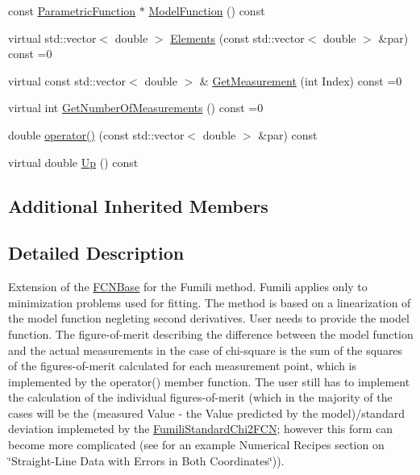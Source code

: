 \begin{DoxyCompactItemize}
\item 
const \mbox{\hyperlink{classROOT_1_1Minuit2_1_1ParametricFunction}{Parametric\+Function}} $\ast$ \mbox{\hyperlink{classROOT_1_1Minuit2_1_1FumiliChi2FCN_a3d31739e476a413e0c5616bb0c6283b9}{Model\+Function}} () const
\item 
virtual std\+::vector$<$ double $>$ \mbox{\hyperlink{classROOT_1_1Minuit2_1_1FumiliChi2FCN_a25cc8dcc2eff831b3c0a94bf5413c2cd}{Elements}} (const std\+::vector$<$ double $>$ \&par) const =0
\item 
virtual const std\+::vector$<$ double $>$ \& \mbox{\hyperlink{classROOT_1_1Minuit2_1_1FumiliChi2FCN_a1831875c53596cd4aa52ea536de53b60}{Get\+Measurement}} (int Index) const =0
\item 
virtual int \mbox{\hyperlink{classROOT_1_1Minuit2_1_1FumiliChi2FCN_afa1acb8484d1c1825de0dd641e301717}{Get\+Number\+Of\+Measurements}} () const =0
\item 
double \mbox{\hyperlink{classROOT_1_1Minuit2_1_1FumiliChi2FCN_ae7b2c2080162c0b946cf54090b712716}{operator()}} (const std\+::vector$<$ double $>$ \&par) const
\item 
virtual double \mbox{\hyperlink{classROOT_1_1Minuit2_1_1FumiliChi2FCN_a7e68bc2b2eb631ec52b753d7d49c4414}{Up}} () const
\end{DoxyCompactItemize}
\subsection*{Additional Inherited Members}


\subsection{Detailed Description}
Extension of the \mbox{\hyperlink{classROOT_1_1Minuit2_1_1FCNBase}{F\+C\+N\+Base}} for the Fumili method. Fumili applies only to minimization problems used for fitting. The method is based on a linearization of the model function negleting second derivatives. User needs to provide the model function. The figure-\/of-\/merit describing the difference between the model function and the actual measurements in the case of chi-\/square is the sum of the squares of the figures-\/of-\/merit calculated for each measurement point, which is implemented by the operator() member function. The user still has to implement the calculation of the individual figures-\/of-\/merit (which in the majority of the cases will be the (measured Value -\/ the Value predicted by the model)/standard deviation implemeted by the \mbox{\hyperlink{classROOT_1_1Minuit2_1_1FumiliStandardChi2FCN}{Fumili\+Standard\+Chi2\+F\+CN}}; however this form can become more complicated (see for an example Numerical Recipes\textquotesingle{} section on \char`\"{}\+Straight-\/\+Line Data with Errors in Both Coordinates\char`\"{})).

